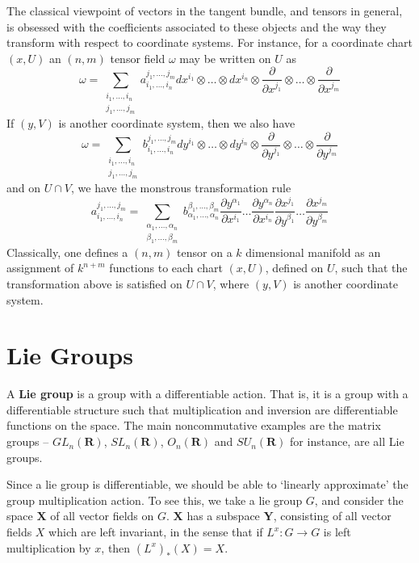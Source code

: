 The classical viewpoint of vectors in the tangent bundle, and tensors in general, is obsessed with the coefficients associated to these objects and the way they transform with respect to coordinate systems. For instance, for a coordinate chart $(x,U)$ an $(n,m)$ tensor field $\omega$ may be written on $U$ as
%
\[ \omega = \sum_{\substack{i_1, \dots, i_n\\j_1, \dots, j_m}} a_{i_1, \dots, i_n}^{j_1, \dots, j_m} dx^{i_1} \otimes \dots \otimes dx^{i_n} \otimes \frac{\partial}{\partial x^{j_1}} \otimes \dots \otimes \frac{\partial}{\partial x^{j_m}} \]
%
If $(y,V)$ is another coordinate system, then we also have
%
\[ \omega = \sum_{\substack{i_1, \dots, i_n\\j_1, \dots, j_m}} b_{i_1, \dots, i_n}^{j_1, \dots, j_m} dy^{i_1} \otimes \dots \otimes dy^{i_n} \otimes \frac{\partial}{\partial y^{j_1}} \otimes \dots \otimes \frac{\partial}{\partial y^{j_m}} \]
%
and on $U \cap V$, we have the monstrous transformation rule
%
\[ a_{i_1, \dots, i_n}^{j_1, \dots, j_m} = \sum_{\substack{\alpha_1, \dots, \alpha_n\\\beta_1, \dots, \beta_m}} b_{\alpha_1, \dots, \alpha_n}^{\beta_1, \dots, \beta_m} \frac{\partial y^{\alpha_1}}{\partial x^{i_1}} \dots \frac{\partial y^{\alpha_n}}{\partial x^{i_n}} \frac{\partial x^{j_1}}{\partial y^{\beta_1}} \dots \frac{\partial x^{j_m}}{\partial y^{\beta_m}} \]
%
Classically, one defines a $(n,m)$ tensor on a $k$ dimensional manifold as an assignment of $k^{n + m}$ functions to each chart $(x,U)$, defined on $U$, such that the transformation above is satisfied on $U \cap V$, where $(y,V)$ is another coordinate system.

\chapter{Lie Groups}

A {\bf Lie group} is a group with a differentiable action. That is, it is a group with a differentiable structure such that multiplication and inversion are differentiable functions on the space. The main noncommutative examples are the matrix groups -- $GL_n(\mathbf{R})$, $SL_n(\mathbf{R})$, $O_n(\mathbf{R})$ and $SU_n(\mathbf{R})$ for instance, are all Lie groups.

Since a lie group is differentiable, we should be able to `linearly approximate' the group multiplication action. To see this, we take a lie group $G$, and consider the space $\mathbf{X}$ of all vector fields on $G$. $\mathbf{X}$ has a subspace $\mathbf{Y}$, consisting of all vector fields $X$ which are left invariant, in the sense that if $L^x: G \to G$ is left multiplication by $x$, then $(L^x)_*(X) = X$.


